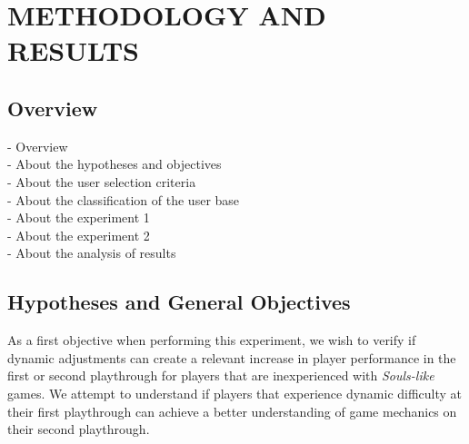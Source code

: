 \chapter{METHODOLOGY AND RESULTS}
\label{ch:methodology-results}

\section{Overview}

- Overview \\
- About the hypotheses and objectives \\
- About the user selection criteria \\
- About the classification of the user base \\
- About the experiment 1 \\
- About the experiment 2 \\
- About the analysis of results 


\section{Hypotheses and General Objectives}
\label{sec:hypotheses-and-objectives}


As a first objective when performing this experiment, we wish to verify if dynamic adjustments can create a relevant increase in player performance in the first or second playthrough for players that are inexperienced with \emph{Souls-like} games. We attempt to understand if players that experience dynamic difficulty at their first playthrough can achieve a better understanding of game mechanics on their second playthrough.

